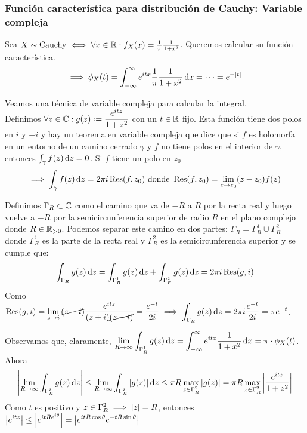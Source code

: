 \subsubsection{Función característica para distribución de Cauchy: Variable compleja}

Sea $X\sim\operatorname{Cauchy} \iff \forall x \in \mathbb{R} : f_X(x) = \frac{1}{\pi} \frac{1}{1+x^2}$. Queremos calcular su función característica.
\[\implies \phi_X(t) = \int_{-\infty}^{\infty} e^{itx} \frac{1}{\pi} \frac{1}{1+x^2}\odif{x} = \cdots = e^{-\abs{t}}\]

Veamos una técnica de variable compleja para calcular la integral. \\
Definimos $\displaystyle \forall z \in \mathbb{C} : g(z) \vcentcolon= \frac{e^{itz}}{1+z^2}$ con un $t\in\mathbb{R}$ fijo. Esta función tiene dos polos en $i$ y $-i$ y hay un teorema en variable compleja que dice que si $f$ es holomorfa en un entorno de un camino cerrado $\gamma$ y $f$ no tiene polos en el interior de $\gamma$, entonces $\int_{\gamma} f(z)\odif{z} = 0$. Si $f$ tiene un polo en $z_0$
\[\implies \int_{\gamma} f(z)\odif{z} = 2\pi i \operatorname{Res}(f, z_0) \tex{ donde }\operatorname{Res}(f, z_0) = \lim_{z\to z_0} (z-z_0)f(z)\]

Definimos $\Gamma_R \subset \mathbb{C}$ como el camino que va de $-R$ a $R$ por la recta real y luego vuelve a $-R$ por la semicircunferencia superior de radio $R$ en el plano complejo donde $R\in \mathbb{R}_{>0}$. Podemos separar este camino en dos partes: $\Gamma_R = \Gamma_R^1 \cup \Gamma_R^2$ donde $\Gamma_R^1$ es la parte de la recta real y $\Gamma_R^2$ es la semicircunferencia superior y se cumple que:
\[\int_{\Gamma_R} g(z)\odif{z} = \int_{\Gamma_R^1} g(z)\odif{z} + \int_{\Gamma_R^2} g(z)\odif{z} = 2\pi i \operatorname{Res}(g, i)\]
Como $\ds \operatorname{Res}(g, i) = \lim_{z\to i} \cancel{(z-i)}\frac{e^{itz}}{(z+i)\cancel{(z-i)}} = \frac{e^{-t}}{2i} \implies \int_{\Gamma_R} g(z)\odif{z} = 2\pi i \frac{e^{-t}}{2i} = \pi e^{-t}$.

Observamos que, claramente, $\ds \lim_{R\to\infty} \int_{\Gamma_R^1} g(z)\odif{z} = \int_{-\infty}^{\infty} e^{itx} \frac{1}{1+x^2}\odif{x} = \pi \cdot \phi_X(t)$. Ahora
\[\abs{\lim_{R\to\infty} \int_{\Gamma_R^2} g(z)\odif{z}} \leq \lim_{R\to\infty} \int_{\Gamma_R^2} \abs{g(z)}\odif{z} \leq \pi R \max_{z\in \Gamma_R^2} \abs{g(z)} = \pi R \max_{z\in \Gamma_R^2} \abs{\frac{e^{itz}}{1+z^2}}\]
Como $t$ es positivo y $z \in \Gamma_R^2 \implies \left|z\right| = R$, entonces $\displaystyle \left|e^{itz}\right| \leq \left|e^{it R e^{i\theta}}\right| = \left|e^{itR\cos{\theta}} e^{-tR\sin{\theta}}\right| $